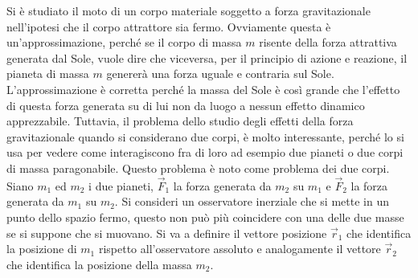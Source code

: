 Si è studiato il moto di un corpo materiale soggetto a forza gravitazionale nell'ipotesi che il corpo attrattore sia fermo. Ovviamente questa è un'approssimazione, perché se il corpo di massa $m$ risente della forza attrattiva generata dal Sole, vuole dire che viceversa, per il principio di azione e reazione, il pianeta di massa $m$ genererà una forza uguale e contraria sul Sole. L'approssimazione è corretta perché la massa del Sole è così grande che l'effetto di questa forza generata su di lui non da luogo a nessun effetto dinamico apprezzabile. Tuttavia, il problema dello studio degli effetti della forza gravitazionale quando si considerano due corpi, è molto interessante, perché lo si usa per vedere come interagiscono fra di loro ad esempio due pianeti o due corpi di massa paragonabile. Questo problema è noto come problema dei due corpi. Siano $m_1$ ed $m_2$ i due pianeti, $\vec{F}_1$ la forza generata da $m_2$ su $m_1$ e $\vec{F}_2$ la forza generata da $m_1$ su $m_2$. Si consideri un osservatore inerziale che si mette in un punto dello spazio fermo, questo non può più coincidere con una delle due masse se si suppone che si muovano. Si va a definire il vettore posizione $\vec{r}_1$ che identifica la posizione di $m_1$ rispetto all'osservatore assoluto e analogamente il vettore $\vec{r}_2$ che identifica la posizione della massa $m_2$.

